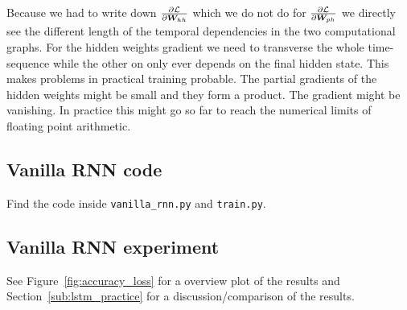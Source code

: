 \documentclass{article}
\begin{document}
Because we had to write down \(\pf{\L}{\B{W}_{hh}}\) which we do not do for \(\pf{\L}{\B{W}_{ph}}\) we directly see the different length of the temporal dependencies in the two computational graphs.
For the hidden weights gradient we need to transverse the whole time-sequence while the other on only ever depends on the final hidden state.
This makes problems in practical training probable.
The partial gradients of the hidden weights might be small and they form a product.
The gradient might be vanishing.
In practice this might go so far to reach the numerical limits of floating point arithmetic.

\subsection{Vanilla RNN code}
Find the code inside \texttt{vanilla\_rnn.py} and \texttt{train.py}.

\subsection{Vanilla RNN experiment}
See Figure~\ref{fig:accuracy_loss} for a overview plot of the results and Section~\ref{sub:lstm_practice} for a discussion/comparison of the results.
\end{document}
